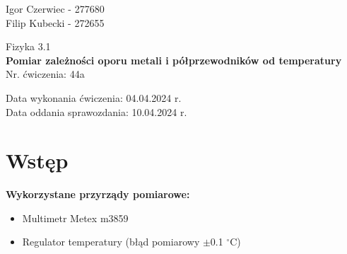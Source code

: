 \documentclass[11pt]{article}
\begin{document}
    \begin{flushright}
        \large{
            Igor Czerwiec - 277680\\
            Filip Kubecki - 272655
        }\\
    \end{flushright}
    \begin{center}
        \large{Fizyka 3.1}\\
        \vspace{2mm}
        \LARGE{\textbf{Pomiar zależności oporu metali i półprzewodników od temperatury}}\\
        \vspace{3mm}
        \huge{Nr. ćwiczenia: 44a}\\
        \vspace{1cm}
    \end{center}
    \begin{flushright}
        \large{
            Data wykonania ćwiczenia: 04.04.2024 r.\\
            Data oddania sprawozdania: 10.04.2024 r.
        }\\
    \end{flushright}

    \section{Wstęp}
    \textbf{Wykorzystane przyrządy pomiarowe:}
    \begin{itemize}
        \itemsep0em
        \item Multimetr Metex m3859
        \item Regulator temperatury (błąd pomiarowy $\pm$0.1 $^\circ$C)
    \end{itemize}
\end{document}
